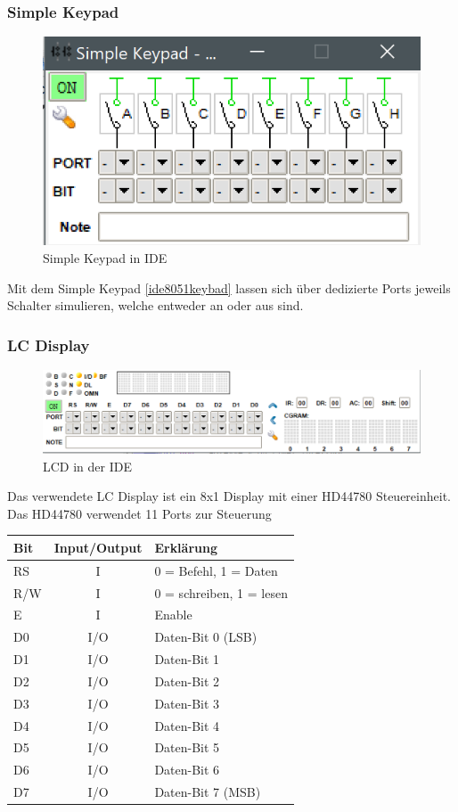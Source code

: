 \documentclass[a4paper,12pt]{article}
\begin{document}
	\subsubsection{Simple Keypad}
	\begin{figure}[bt]
		\centering
		\includegraphics[width=0.7\linewidth]{Bilder/keypad}
		\caption[IDE Screenshot]{Simple Keypad in IDE}
		\label{fig:ide8051keybad}
	\end{figure}
	Mit dem Simple Keypad \ref{ide8051keybad} lassen sich über dedizierte Ports jeweils Schalter simulieren, welche entweder an oder aus sind. 
	
	\subsubsection{LC Display}
	\begin{figure}[bt]
		\centering
		\includegraphics[width=0.7\linewidth]{Bilder/lcd}
		\caption[IDE Screenshot]{LCD in der IDE}
		\label{fig:ide8051lcd}
	\end{figure}
	Das verwendete LC Display ist ein 8x1 Display mit einer HD44780 Steuereinheit. Das HD44780 verwendet 11 Ports zur Steuerung
	
	\begin{tabular}{l|c|l}
		Bit & Input/Output & Erklärung \\ \hline
		RS & I & 0 = Befehl, 1 = Daten \\
		R/W & I & 0 = schreiben, 1 = lesen \\
		E & I & Enable \\
		D0 & I/O & Daten-Bit 0 (LSB) \\
		D1 & I/O & Daten-Bit 1 \\
		D2 & I/O & Daten-Bit 2 \\
		D3 & I/O & Daten-Bit 3 \\
		D4 & I/O & Daten-Bit 4 \\
		D5 & I/O & Daten-Bit 5 \\
		D6 & I/O & Daten-Bit 6 \\
		D7 & I/O & Daten-Bit 7 (MSB)
	\end{tabular}\\
	
\end{document}
